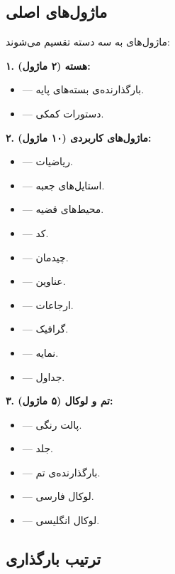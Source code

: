 \subsection{ماژول‌های اصلی}
\label{sec:introduction-modules}

ماژول‌های  به سه دسته تقسیم می‌شوند:

\textbf{۱. هسته (۲ ماژول):}
\begin{itemize}
    \item {} — بارگذارنده‌ی
    بسته‌های پایه.
    \item {} — دستورات کمکی.
\end{itemize}

\textbf{۲. ماژول‌های کاربردی (۱۰ ماژول):}
\begin{itemize}
    \item {} — ریاضیات.
    \item {} — استایل‌های
    جعبه.
    \item {} — محیط‌های
    قضیه.
    \item {} — کد.
    \item {} — چیدمان.
    \item {} — عناوین.
    \item {} — ارجاعات.
    \item {} — گرافیک.
    \item {} — نمایه.
    \item {} — جداول.
\end{itemize}

\textbf{۳. تم و لوکال (۵ ماژول):}
\begin{itemize}
    \item {} — پالت
    رنگی.
    \item {} — جلد.
    \item {} —
    بارگذارنده‌ی تم.
    \item {} — لوکال فارسی.
    \item {} — لوکال انگلیسی.
\end{itemize}

\subsection{ترتیب بارگذاری}
\label{sec:introduction-loading-order}

